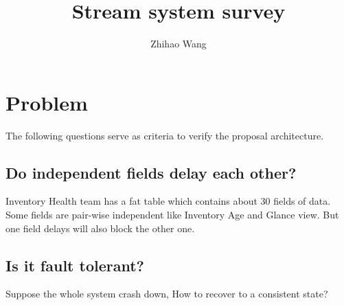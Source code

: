 \documentclass[12pt]{article}
\title{Stream system survey}
\author{Zhihao Wang}
\begin{document}
\maketitle

\section{Problem}
The following questions serve as criteria to verify the proposal architecture. 

\subsection{Do independent fields delay each other?}
Inventory Health team has a fat table which contains about 30 fields of data. Some fields are pair-wise independent like Inventory Age and Glance view. But one field delays will also block the other one.

\subsection{Is it fault tolerant?}
Suppose the whole system crash down, How to recover to a consistent state?
\end{document}

